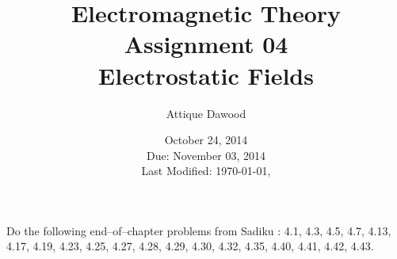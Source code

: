 \documentclass[12pt,a4paper]{article}
\title{Electromagnetic Theory\\Assignment 04\\Electrostatic Fields}
\author{Attique Dawood}
\date{October 24, 2014\\Due: November 03, 2014\\[0.2cm] Last Modified: \today, \currenttime}
\begin{document}
\maketitle
Do the following end--of--chapter problems from Sadiku \cite[Page 155--160]{Sadiku}: 4.1, 4.3, 4.5, 4.7, 4.13, 4.17, 4.19, 4.23, 4.25, 4.27, 4.28, 4.29, 4.30, 4.32, 4.35, 4.40, 4.41, 4.42, 4.43.


\end{document}
